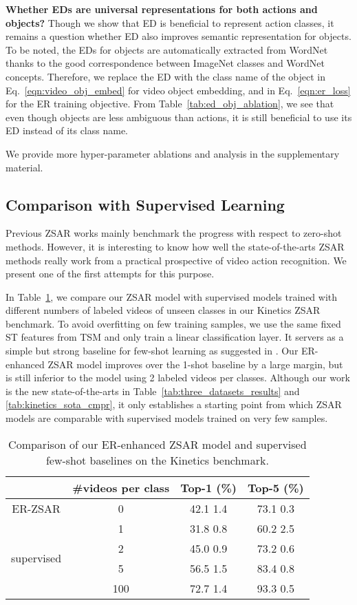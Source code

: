 \textbf{Whether EDs are universal representations for both actions and objects?}
Though we show that ED is beneficial to represent action classes, it remains a question whether ED also improves semantic representation for objects.
To be noted, the EDs for objects are automatically extracted from WordNet thanks to the good correspondence between ImageNet classes and WordNet concepts.
Therefore, we replace the ED with the class name of the object in Eq.~\ref{eqn:video_obj_embed} for video object embedding, and in Eq.~\ref{eqn:er_loss} for the ER training objective.
From Table~\ref{tab:ed_obj_ablation}, we see that even though objects are less ambiguous than actions, it is still beneficial to use its ED instead of its class name.

We provide more hyper-parameter ablations and analysis in the supplementary material.

\subsection{Comparison with Supervised Learning}
Previous ZSAR works mainly benchmark the progress with respect to zero-shot methods. However, it is interesting to know how well the state-of-the-arts ZSAR methods really work from a practical prospective of video action recognition. We present one of the first attempts for this purpose. 

In Table~\ref{tab:few_shot_comparison}, we compare our ZSAR model with supervised models trained with different numbers of labeled videos of unseen classes in our Kinetics ZSAR benchmark.
To avoid overfitting on few training samples, we use the same fixed ST features from TSM and only train a linear classification layer. 
It servers as a simple but strong baseline for few-shot learning as suggested in \cite{tian2020rethinking}.
Our ER-enhanced ZSAR model improves over the 1-shot baseline by a large margin, but is still inferior to the model using 2 labeled videos per classes. 
Although our work is the new state-of-the-arts in Table~\ref{tab:three_datasets_results} and \ref{tab:kinetics_sota_cmpr}, it only establishes a starting point from which ZSAR models are comparable with supervised models trained on very few samples.



\begin{table}
	\centering
	\small
	\begin{tabular}{cccc} \toprule
		& \#videos per class & Top-1 (\%) & Top-5 (\%) \\ \midrule
		ER-ZSAR & 0 &42.1  1.4 & 73.1  0.3  \\ \midrule
		\multirow{4}{*}{supervised} & 1 & 31.8  0.8 & 60.2  2.5 \\
		& 2 & 45.0  0.9 & 73.2  0.6 \\
		& 5 & 56.5  1.5 & 83.4  0.8 \\
		& 100 & 72.7  1.4 & 93.3  0.5 \\ \bottomrule
\end{tabular}
	\caption{Comparison of our ER-enhanced ZSAR model and supervised few-shot baselines on the Kinetics benchmark.}
	\label{tab:few_shot_comparison}
	\vspace{-0.2cm}
\end{table}
